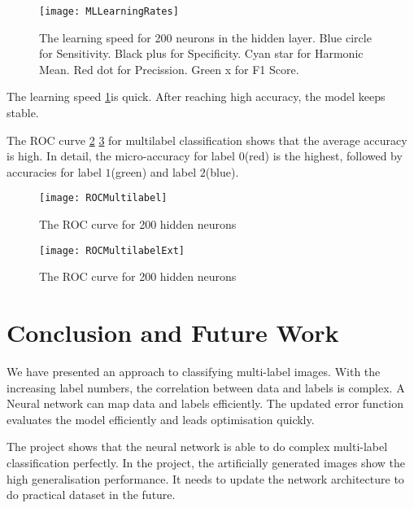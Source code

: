\begin{figure}[htb]
\centering
\texttt{[image: MLLearningRates]}
\caption{\label{fig:MLLearningRates}The learning speed for 200 neurons in the hidden layer. Blue circle for Sensitivity. Black plus for Specificity. Cyan star for Harmonic Mean. Red dot for Precission. Green x for  F1 Score.}
\end{figure}
The learning speed \ref{fig:MLLearningRates}is quick. After reaching high accuracy, the model keeps stable. 

The ROC curve \ref{fig:MLROCCurve} \ref{fig:MLROCCurveExt} for multilabel classification shows that the average accuracy is high. In detail, the micro-accuracy for label $0$(red) is the highest, followed by accuracies for label $1$(green) and label $2$(blue). 
\begin{figure}[htb]
\centering
\texttt{[image: ROCMultilabel]}
\caption{\label{fig:MLROCCurve}The ROC curve for 200 hidden neurons}
\end{figure}

\begin{figure}[htb]
\centering
\texttt{[image: ROCMultilabelExt]}
\caption{\label{fig:MLROCCurveExt}The ROC curve for 200 hidden neurons}
\end{figure}

\section{Conclusion and Future Work}

We have presented an approach to classifying multi-label images. With the increasing label numbers, the correlation between data and labels is complex. A Neural network can map data and labels efficiently. The updated error function evaluates the model efficiently and leads optimisation quickly. 

The project shows that the neural network is able to do complex multi-label classification perfectly. In the project, the artificially generated images show the high generalisation performance. It needs to update the network architecture to do practical dataset in the future.












